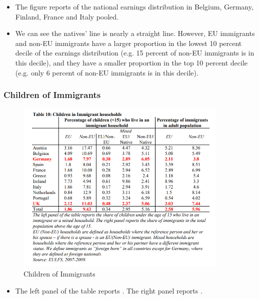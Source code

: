            \begin{itemize}
                \item The figure reports  of the national earnings distribution in Belgium, Germany, Finland, France and Italy pooled.
                \item We can see the natives' line is nearly a straight line. However,  EU immigrants and non-EU immigrants have a larger proportion in the lowest 10 percent decile of the earnings distribution (e.g. 15 percent of non-EU immigrants is in this decile), and they have a smaller proportion in the top 10 percent decile (e.g. only 6 percent of non-EU immigrants is in this decile). 
            \end{itemize}

        \subsubsection{Children of Immigrants}

            \begin{figure}[H]
                \centering
                \includegraphics[width=4in]{images/ch11/10.png}
                \caption{Children of Immigrants}
            \end{figure}
            
            \begin{itemize}
                \item The left panel of the table reports . The right panel reports .
            \end{itemize}

